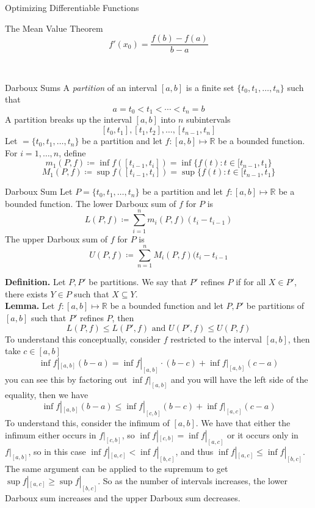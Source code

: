 \documentclass{article}
\newcommand{\real}{\mathbb{R}}
\begin{document}
\begin{multicols*}{3}
\begin{blackbox}{Optimizing Differentiable Functions}
\begin{bluebox}{The Mean Value Theorem}
        \[f'(x_0) = \frac{f(b) - f(a)}{b-a}\]
    \end{bluebox}\\[-2ex]
\end{blackbox}
\begin{blackbox}{Darboux Sums}
    A \emph{partition} of an interval $[a,b]$ is a finite set $\{t_0, t_1, \ldots, t_n\}$ such that 
    \[a = t_0 < t_1 < \cdots < t_n = b\]
    A partition breaks up the interval $[a,b]$ into $n$ subintervals \\[-2ex]
    \[[t_0, t_1], [t_1, t_2], \ldots, [t_{n-1}, t_n]\]
    Let $ = \{t_0, t_1, \ldots, t_n\}$ be a partition and let $f: [a,b] \mapsto \real$ be a bounded function. For $i = 1, \ldots, n$, define
    \[m_1(P,f) \coloneqq \inf f([t_{i-1}, t_i]) = \inf \{f(t) : t \in [t_{n-1}, t_1\}\]
    \[M_1(P,f) \coloneqq \sup f([t_{i-1}, t_i]) = \sup \{f(t) : t \in [t_{n-1}, t_1\}\]
    \begin{bluebox}{Darboux Sum}
        Let $P = \{t_0, t_1, \ldots, t_n\}$ be a partition and let $f: [a,b] \mapsto \real$ be a bounded function. The lower Darboux sum of $f$ for $P$ is \\[-2ex]
        \[L(P,f) \coloneqq \sum_{i=1}^n m_i(P,f)(t_i - t_{i-1})\]
        The upper Darboux sum of $f$ for $P$ is \\[-2ex]
        \[U(P,f) \coloneqq \sum_{n=1}^n M_i(P,f)(t_i - t_{i-1}\]
    \end{bluebox}
    \textbf{Definition.} Let $P, P'$ be partitions. We say that $P'$ refines $P$ if for all $X \in P'$, there exists $Y \in P$ such that $X \subseteq Y$.\\[1ex]
    \textbf{Lemma.} Let $f: [a,b] \mapsto \real$ be a bounded function and let $P, P'$ be partitions of $[a,b]$ such that $P'$ refines $P$, then \\[-2ex]
    \[L(P, f) \leq L(P',f) \text{ and } U(P', f) \leq U(P, f)\]
    To understand this conceptually, consider $f$ restricted to the interval $[a,b]$, then take $c \in [a,b]$ \\[-2ex] 
    \[\inf f|_{[a,b]} (b-a) = \inf f|_{[a,b]} \cdot (b-c) + \inf f|_{[a,b]} (c -a)\]
    you can see this by factoring out $\inf f|_{[a,b]}$ and you will have the left side of the equality, then we have\\[-2ex]
    \[\inf f|_{[a,b]} (b-a)  \leq \inf f|_{[c,b]} (b - c) +  \inf f|_{[a,c]} (c -a)\]
    To understand this, consider the infimum of $[a,b]$. We have that either the infimum either occurs in $f|_[c,b]$, so $\inf f|_{[c,b]} = \inf f|_{[a,c]}$ or it occurs only in $f|_{[a,b]}$, so in this case $ \inf f|_{[a,c]} <  \inf f|_{[b,c]}$, and thus $ \inf f|_{[a,c]} \leq  \inf f|_{[b,c]}$. The same argument can be applied to the supremum to get $ \sup f|_{[a,c]} \geq  \sup f|_{[b,c]}$. So as the number of intervals increases, the lower Darboux sum increases and the upper Darboux sum decreases.

\end{blackbox}
\end{multicols*}
\end{document}
